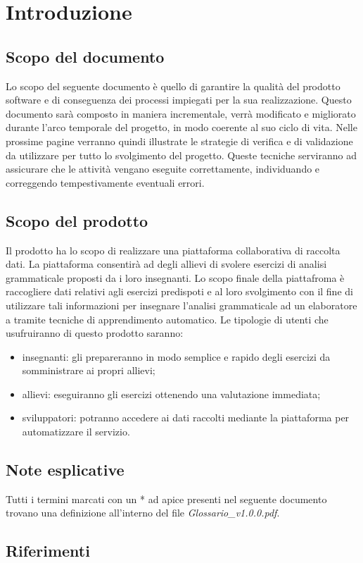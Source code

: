 \section{Introduzione}
\subsection{Scopo del documento}
Lo scopo del seguente documento è quello di garantire la qualità del prodotto software e di conseguenza dei processi impiegati per la sua realizzazione. Questo documento sarà composto in maniera incrementale, verrà modificato e migliorato durante l'arco temporale del progetto, in modo coerente al suo ciclo di vita. Nelle prossime pagine verranno quindi illustrate le strategie di verifica e di validazione da utilizzare per tutto lo svolgimento del progetto. Queste tecniche serviranno ad assicurare che le attività vengano eseguite correttamente, individuando e correggendo tempestivamente eventuali errori.
\subsection{Scopo del prodotto}
Il prodotto ha lo scopo di realizzare una piattaforma collaborativa di raccolta dati.  La piattaforma consentirà ad degli allievi di svolere esercizi di analisi grammaticale proposti da i loro insegnanti.
Lo scopo finale della piattafroma è raccogliere dati relativi agli esercizi predispoti e al loro svolgimento con il fine di utilizzare tali informazioni per insegnare l'analisi grammaticale ad un elaboratore a tramite tecniche di apprendimento automatico.
Le tipologie di utenti che usufruiranno di questo prodotto saranno:
\begin{itemize}
	\item insegnanti: gli prepareranno in modo semplice e rapido degli esercizi da somministrare ai propri allievi;
	\item allievi: eseguiranno gli esercizi ottenendo una valutazione immediata;
	\item sviluppatori: potranno accedere ai dati raccolti mediante la piattaforma per
	automatizzare il servizio.
\end{itemize}
\subsection{Note esplicative}
Tutti i termini marcati con un * ad apice presenti nel seguente documento trovano una definizione all'interno del file \textit{Glossario\_v1.0.0.pdf}.
\subsection{Riferimenti}
